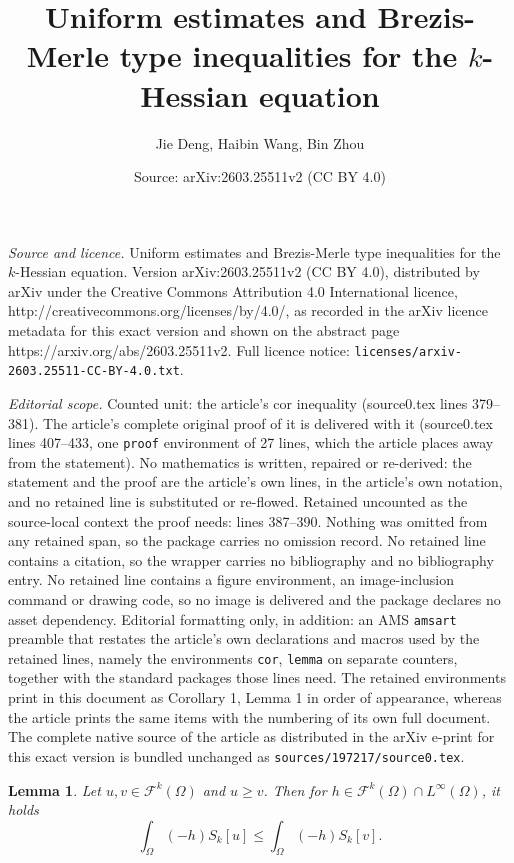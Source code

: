 \documentclass[10pt,a4paper]{amsart}
\title{Uniform estimates and Brezis-Merle type inequalities for the $k$-Hessian equation}
\author{Jie Deng, Haibin Wang, Bin Zhou}
\date{Source: arXiv:2603.25511v2 (CC BY 4.0)}
\newtheorem{lemma}{Lemma}
\begin{document}
\maketitle

\noindent\emph{Source and licence.} Uniform estimates and Brezis-Merle type inequalities for the $k$-Hessian equation. Version arXiv:2603.25511v2 (CC BY 4.0), distributed by arXiv under the Creative Commons Attribution 4.0 International licence, http://creativecommons.org/licenses/by/4.0/, as recorded in the arXiv licence metadata for this exact version and shown on the abstract page https://arxiv.org/abs/2603.25511v2. Full licence notice: \texttt{licenses/arxiv-2603.25511-CC-BY-4.0.txt}.\par\smallskip

\noindent\textit{Editorial scope.} Counted unit: the article's cor inequality (source0.tex lines 379--381). The article's complete original proof of it is delivered with it (source0.tex lines 407--433, one \texttt{proof} environment of 27 lines, which the article places away from the statement). No mathematics is written, repaired or re-derived: the statement and the proof are the article's own lines, in the article's own notation, and no retained line is substituted or re-flowed.  Retained uncounted as the source-local context the proof needs: lines 387--390.  Nothing was omitted from any retained span, so the package carries no omission record.  No retained line contains a citation, so the wrapper carries no bibliography and no bibliography entry.  No retained line contains a figure environment, an image-inclusion command or drawing code, so no image is delivered and the package declares no asset dependency.  Editorial formatting only, in addition: an AMS \texttt{amsart} preamble that restates the article's own declarations and macros used by the retained lines, namely the environments \texttt{cor}, \texttt{lemma} on separate counters, together with the standard packages those lines need.  The retained environments print in this document as Corollary 1, Lemma 1 in order of appearance, whereas the article prints the same items with the numbering of its own full document.  The complete native source of the article as distributed in the arXiv e-print for this exact version is bundled unchanged as \texttt{sources/197217/source0.tex}.
\begin{lemma}\label{hessian comparison}
	Let $u, v \in \mathcal{F}^k(\Omega)$ and $u \ge v$. Then for $h \in \mathcal{F}^k(\Omega)\cap L^\infty(\Omega)$, it holds
	$$\int_{\Omega} (-h) S_k[u] \le \int_{\Omega} (-h) S_k[v].$$
\end{lemma}
\end{document}
